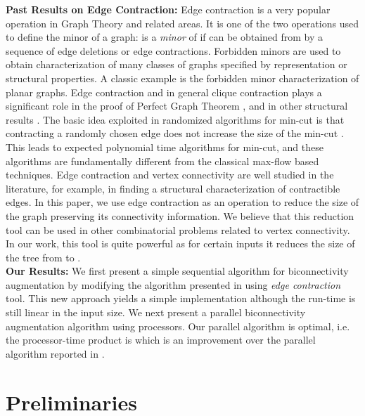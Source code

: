 \documentclass[runningheads]{llncs}
\begin{document}
{\bf Past Results on Edge Contraction:} Edge contraction is a very popular operation in Graph Theory and related areas.  It is one of the two operations used to define the minor of a graph:  is a {\em minor} of  if  can be obtained from  by a sequence of edge deletions or edge contractions.    Forbidden minors are used to obtain characterization of many classes of graphs specified by representation or structural properties. A classic example is the forbidden minor characterization of planar graphs.  Edge contraction and in general clique contraction plays a significant role in the proof of Perfect Graph Theorem \cite{golu}, and in other structural results \cite{matthias}.  The basic idea exploited in randomized algorithms for min-cut is that contracting a randomly chosen edge does not increase the size of the min-cut \cite{karger}.  This leads to expected polynomial time algorithms for min-cut, and these algorithms are fundamentally different from the classical max-flow based techniques.  Edge contraction and vertex connectivity are well studied in the literature, for example, in finding a structural characterization of contractible edges.  In this paper, we use edge contraction as an operation to reduce the size of the graph preserving its connectivity information.  We believe that this reduction tool can be used in other combinatorial problems related to vertex connectivity.  In our work, this tool is quite powerful as for certain inputs it reduces the size of the tree from  to .\\ 
{\bf Our Results:} We first present a simple sequential algorithm for biconnectivity augmentation by modifying the algorithm presented in \cite{nsn} using {\em edge contraction} tool.  This new approach yields a simple implementation although the run-time is still linear in the input size.  We next present a parallel biconnectivity augmentation algorithm using  processors.  Our parallel algorithm is optimal, i.e. the processor-time product is  which is an improvement over the parallel algorithm reported in \cite{hsu}.
\section{Preliminaries}
\end{document}
